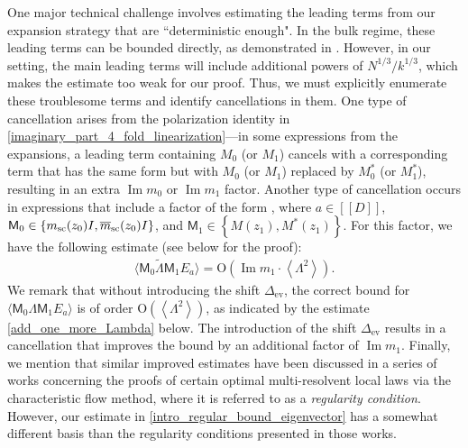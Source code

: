 \documentclass[10pt,reqno]{amsart}
\numberwithin{equation}{section}
\numberwithin{figure}{section}
\theoremstyle{plain} %
\theoremstyle{definition} %
\newcommand{\wh}{\widehat}
\newcommand{\wt}{\widetilde}
\renewcommand{\txt}[1]{\text{\rm{#1}}}
\newcommand{\sM}{\mathsf M}
\renewcommand{\bar}{\overline}
\newcommand{\qq}[1]{[\![{#1}]\!]}
\newcommand{\pa}[1]{\left({#1}\right)}
\newcommand{\ha}[1]{\left\{{#1}\right\}}
\newcommand{\avg}[1]{\langle #1 \rangle}
\newcommand{\avga}[1]{\left\langle #1 \right\rangle}
\DeclareMathOperator{\im}{\mathrm{Im}}
\newcommand{\OO}{\mathrm{O}}
\newcommand{\opr}[1]{\mathrm{O}_\prec\left({#1}\right)}
\numberwithin{equation}{section}
\begin{document}
One major technical challenge involves estimating the leading terms from our expansion strategy that are ``deterministic enough". In the bulk regime, these leading terms can be bounded directly, as demonstrated in \cite{stone2024randommatrixmodelquantum}. However, in our setting, the main leading terms will include additional powers of $N^{1/3}/k^{1/3}$, which makes the estimate too weak for our proof. 
Thus, we must explicitly enumerate these troublesome terms and identify cancellations in them. 
One type of cancellation arises from the polarization identity in \eqref{imaginary_part_4_fold_linearization}---in some expressions from the expansions, a leading term containing $M_0$ (or $M_1$) cancels with a corresponding term that has the same form but with $M_0$ (or $M_1$) replaced by $M_0^*$ (or $M_1^*$), resulting in an extra $\im m_0$ or $\im m_1$ factor. 
Another type of cancellation occurs in expressions that include a factor of the form \smash{$\avg{\sM_0\wt \Lambda \sM_1E_a}$}, where $a\in\qq D$, $\sM_0\in \ha{m_\txt{sc}(z_0)I,\bar{m}_\txt{sc}(z_0)I}$, and  $\sM_1\in \ha{M(z_1),M^*(z_1)}$.
For this factor, we have the following estimate (see  below for the proof):
\begin{equation}\label{intro_regular_bound_eigenvector}
    \begin{aligned}
        \avg{\sM_0\wt \Lambda \sM_1E_a}=\OO\pa{\im m_1\cdot \avga{\Lambda^2}}.
    \end{aligned}
\end{equation} 
We remark that without introducing the shift  $\Delta_{\mathrm{ev}}$, the correct bound for $\avg{\sM_0 \Lambda \sM_1E_a}$ is of order $\OO(\avga{\Lambda^2})$, as indicated by the estimate \eqref{add_one_more_Lambda} below. The introduction of the shift $\Delta_{\mathrm{ev}}$ results in a cancellation that improves the bound by an additional factor of $\im m_1$. %
Finally, we mention that similar improved estimates have been discussed in a series of works \cite{CEH2023,erdHos2024eigenstate,CGLJ2024_AJMP,CGEHJD2024_JFA} concerning the proofs of certain optimal multi-resolvent local laws via the characteristic flow method, where it is referred to as a \emph{regularity condition}. However, our estimate in \eqref{intro_regular_bound_eigenvector} has a somewhat different basis than the regularity conditions presented in those works.
\end{document}
